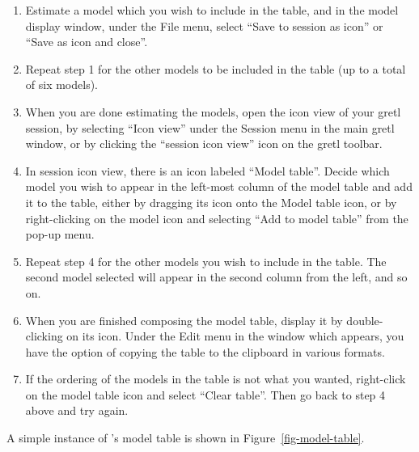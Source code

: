 \begin{enumerate}
\item Estimate a model which you wish to include in the table, and in
  the model display window, under the File menu, select ``Save to
  session as icon'' or ``Save as icon and close''.
\item Repeat step 1 for the other models to be included in the table
  (up to a total of six models).
\item When you are done estimating the models, open the icon view of
  your gretl session, by selecting ``Icon view'' under the Session
  menu in the main gretl window, or by clicking the ``session icon
  view'' icon on the gretl toolbar.
\item In session icon view, there is an icon labeled ``Model table''.
  Decide which model you wish to appear in the left-most column of the
  model table and add it to the table, either by dragging its icon
  onto the Model table icon, or by right-clicking on the model icon
  and selecting ``Add to model table'' from the pop-up menu.
\item Repeat step 4 for the other models you wish to include in the
  table.  The second model selected will appear in the second column
  from the left, and so on.
\item When you are finished composing the model table, display it by
  double-clicking on its icon.  Under the Edit menu in the window
  which appears, you have the option of copying the table to the
  clipboard in various formats.
\item If the ordering of the models in the table is not what you
  wanted, right-click on the model table icon and select ``Clear
  table''.  Then go back to step 4 above and try again.
\end{enumerate}

A simple instance of 's model table is shown in
Figure~\ref{fig-model-table}.


